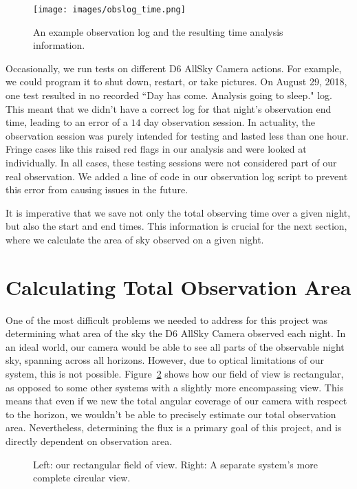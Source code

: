 \begin{figure}[ht!]
  \centering
  \texttt{[image: images/obslog\_time.png]}
  \caption{An example observation log and the resulting time analysis information.}
  \label{obslog_time}
\end{figure}

Occasionally, we run tests on different D6 AllSky Camera actions. 
For example, we could program it to shut down, restart, or take pictures.
On August 29, 2018, one test resulted in no recorded ``Day has come.  Analysis going to sleep." log.
This meant that we didn't have a correct log for that night's observation end time, leading to an error of a $14$ day observation session.
In actuality, the observation session was purely intended for testing and lasted less than one hour.  
Fringe cases like this raised red flags in our analysis and were looked at individually.
In all cases, these testing sessions were not considered part of our real observation.
We added a line of code in our observation log script to prevent this error from causing issues in the future.

It is imperative that we save not only the total observing time over a given night, but also the start and end times. 
This information is crucial for the next section, where we calculate the area of sky observed on a given night.

\section{Calculating Total Observation Area}

One of the most difficult problems we needed to address for this project was determining what area of the sky the D6 AllSky Camera observed each night.  
In an ideal world, our camera would be able to see all parts of the observable night sky, spanning across all horizons.  
However, due to optical limitations of our system, this is not possible.
Figure~\ref{views_sidebyside} shows how our field of view is rectangular, as opposed to some other systems with a slightly more encompassing view.
This means that even if we new the total angular coverage of our camera with respect to the horizon, we wouldn't be able to precisely estimate our total observation area.
Nevertheless, determining the flux is a primary goal of this project, and is directly dependent on observation area. 

\begin{figure}[ht!]
  \caption{Left: our rectangular field of view.  Right:  A separate system's more complete circular view.}
  \label{views_sidebyside}
\end{figure}

